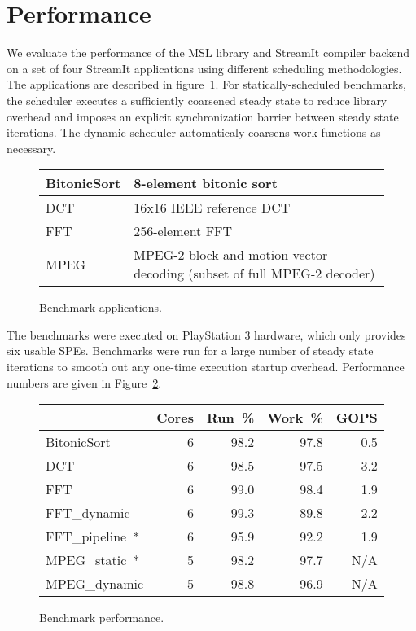 \section{Performance}\label{ch:perf}

We evaluate the performance of the MSL library and StreamIt compiler backend
on a set of four StreamIt applications using different scheduling
methodologies. The applications are described in figure~\ref{fig:perf:apps}.
For statically-scheduled benchmarks, the scheduler executes a sufficiently
coarsened steady state to reduce library overhead and imposes an explicit
synchronization barrier between steady state iterations. The dynamic scheduler
automaticaly coarsens work functions as necessary.

\begin{figure}[!htb]
\begin{center}
\begin{tabular}{|l|p{2.25in}|}
\hline
BitonicSort & 8-element bitonic sort \\
\hline
DCT & 16x16 IEEE reference DCT \\
\hline
FFT & 256-element FFT \\
\hline
MPEG & MPEG-2 block and motion vector decoding (subset of full MPEG-2 decoder) \\
\hline
\end{tabular}
\end{center}
\caption{Benchmark applications.}
\label{fig:perf:apps}
\end{figure}

The benchmarks were executed on PlayStation 3 hardware, which only provides
six usable SPEs. Benchmarks were run for a large number of steady state
iterations to smooth out any one-time execution startup overhead.
Performance numbers are given in Figure~\ref{fig:perf:stats}.

\begin{figure}[!htb]
\begin{center}
\begin{tabular}{|l|r|r|r|r|}
\hline
& Cores & Run~\% & Work~\% & GOPS \\
\hline
\textsf{BitonicSort} & 6 & 98.2 & 97.8 & 0.5 \\
\hline
\textsf{DCT} & 6 & 98.5 & 97.5 & 3.2 \\
\hline
\textsf{FFT} & 6 & 99.0 & 98.4 & 1.9 \\
\hline
\textsf{FFT\_dynamic} & 6 & 99.3 & 89.8 & 2.2 \\
\hline
\textsf{FFT\_pipeline~*} & 6 & 95.9 & 92.2 & 1.9 \\
\hline
\textsf{MPEG\_static~*} & 5 & 98.2 & 97.7 & N/A \\
\hline
\textsf{MPEG\_dynamic} & 5 & 98.8 & 96.9 & N/A \\
\hline
\end{tabular}
\end{center}
\caption{Benchmark performance.}
\label{fig:perf:stats}
\end{figure}

